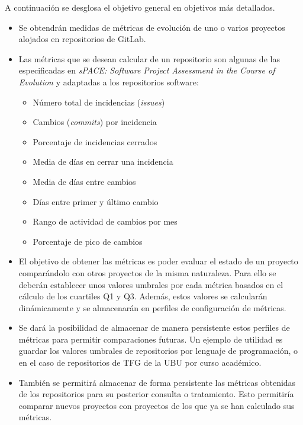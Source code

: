 A continuación se desglosa el objetivo general  en objetivos más detallados.
\begin{itemize}
	\tightlist
	\item Se obtendrán medidas de métricas de evolución de uno o varios proyectos alojados en repositorios de GitLab.
	\item Las métricas que se desean calcular de un repositorio  son algunas de las especificadas en \textit{sPACE: Software Project Assessment in the Course of Evolution} \cite{ratzinger_space:_2007} y 
	adaptadas a los repositorios software:
	\begin{itemize}
		\tightlist
		\item Número total de incidencias (\textit{issues})
		\item Cambios (\textit{commits}) por incidencia
		\item Porcentaje de incidencias cerrados
		\item Media de días en cerrar una incidencia
		\item Media de días entre cambios
		\item Días entre primer y último cambio
		\item Rango de actividad de cambios por mes
		\item Porcentaje de pico de cambios
	\end{itemize}
	\item El objetivo de obtener las métricas es poder evaluar el estado de un proyecto comparándolo con otros proyectos de la misma naturaleza. Para ello se deberán establecer unos valores umbrales por cada métrica basados en el cálculo de los cuartiles Q1 y Q3. Además, estos valores se calcularán dinámicamente y se almacenarán en perfiles de configuración de métricas.
	\item Se dará la posibilidad de almacenar de manera persistente estos perfiles de métricas para permitir comparaciones futuras. Un ejemplo de utilidad es guardar los valores umbrales de repositorios por lenguaje de programación, o en el caso de repositorios de TFG de la UBU por curso académico.
	\item También se permitirá almacenar de forma persistente las métricas obtenidas de los repositorios para su posterior consulta o tratamiento. Esto permitiría comparar nuevos proyectos con proyectos de los que ya se han calculado sus métricas.
\end{itemize}
